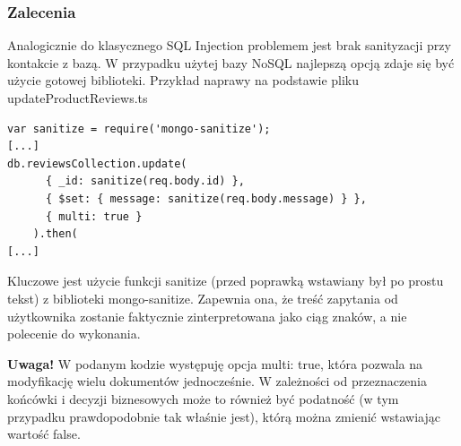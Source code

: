 \subsubsection{Zalecenia}

Analogicznie do klasycznego SQL Injection problemem jest brak sanityzacji przy kontakcie z bazą. W przypadku użytej bazy NoSQL najlepszą opcją zdaje się być użycie gotowej biblioteki. Przykład naprawy na podstawie pliku updateProductReviews.ts
\begin{lstlisting}
var sanitize = require('mongo-sanitize');
[...]
db.reviewsCollection.update( 
      { _id: sanitize(req.body.id) }, 
      { $set: { message: sanitize(req.body.message) } },
      { multi: true }  
    ).then(
[...]
\end{lstlisting}
Kluczowe jest użycie funkcji sanitize (przed poprawką wstawiany był po prostu tekst) z biblioteki mongo-sanitize. Zapewnia ona, że treść zapytania od użytkownika zostanie faktycznie zinterpretowana jako ciąg znaków, a nie polecenie do wykonania. 

\textbf{Uwaga!} W podanym kodzie występuję opcja multi: true, która pozwala na modyfikację wielu dokumentów jednocześnie. W zależności od przeznaczenia końcówki i decyzji biznesowych może to również być podatność (w tym przypadku prawdopodobnie tak właśnie jest), którą można zmienić wstawiając wartość false. 
